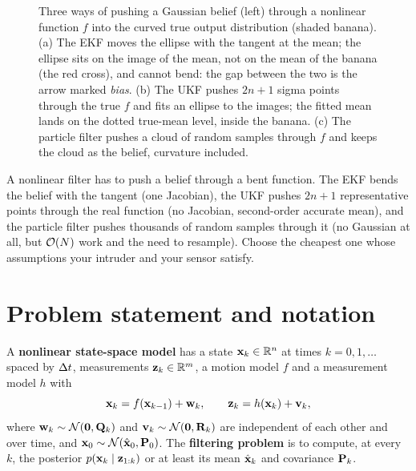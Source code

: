 \begin{figure}[tb]
  \centering
  \caption{Three ways of pushing a Gaussian belief (left) through a
  nonlinear function $f$ into the curved true output distribution (shaded
  banana). (a) The EKF moves the ellipse with the tangent at the mean; the
  ellipse sits on the image of the mean, not on the mean of the banana (the
  red cross), and cannot bend: the gap between the two is the arrow marked
  \emph{bias}. (b) The UKF pushes $2n+1$ sigma points through the true $f$
  and fits an ellipse to the images; the fitted mean lands on the dotted
  true-mean level, inside the banana.
  (c) The particle filter pushes a cloud of random samples through $f$ and
  keeps the cloud as the belief, curvature included.}
  \label{fig:ch19-idea}
\end{figure}

\begin{keyidea}
A nonlinear filter has to push a belief through a bent function. The EKF
bends the belief with the tangent (one Jacobian), the UKF pushes $2n+1$
representative points through the real function (no Jacobian, second-order
accurate mean), and the particle filter pushes thousands of random samples
through it (no Gaussian at all, but $\mathcal{O}\!\left(N\right)$ work and the need to
resample). Choose the cheapest one whose assumptions your intruder and your
sensor satisfy.
\end{keyidea}

\section[Problem and notation]{Problem statement and notation}
\label{sec:ch19-problem}

\begin{definition}
\label{def:ch19-model}
A \textbf{nonlinear state-space model} has
a state $\mathbf{x}_k \in \mathbb{R}^n$ at times $k = 0, 1, \dots$ spaced by $\Delta t$,
measurements $\mathbf{z}_k \in \mathbb{R}^m$, a motion model $f$ and a measurement model
$h$ with
\begin{equation}
  \mathbf{x}_k = f(\mathbf{x}_{k-1}) + \mathbf{w}_k, \qquad
  \mathbf{z}_k = h(\mathbf{x}_k) + \mathbf{v}_k,
  \label{eq:ch19-model}
\end{equation}
where $\mathbf{w}_k \sim \mathcal{N}(\mathbf{0}, \mathbf{Q}_k)$ and $\mathbf{v}_k \sim
\mathcal{N}(\mathbf{0}, \mathbf{R}_k)$ are independent of each other and over time, and
$\mathbf{x}_0 \sim \mathcal{N}(\hat{\mathbf{x}}_0, \mathbf{P}_0)$. The \textbf{filtering
problem} is to compute, at every $k$, the posterior
$p(\mathbf{x}_k \mid \mathbf{z}_{1:k})$ or at least its mean $\hat{\mathbf{x}}_k$ and
covariance $\mathbf{P}_k$.
\end{definition}

